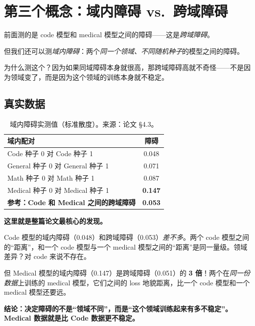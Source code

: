 \documentclass[12pt,a4paper]{ctexart}
\begin{document}
\section{第三个概念：域内障碍 vs.\ 跨域障碍}

\begin{explainbox}
前面测的是 code 模型和 medical 模型之间的障碍——这是\emph{跨域障碍}。

但我们还可以测\emph{域内障碍}：两个\emph{同一个领域、不同随机种子}的模型之间的障碍。

为什么测这个？因为如果同域障碍本身就很高，那跨域障碍高就不奇怪——不是因为领域变了，而是因为这个领域的训练本身就不稳定。
\end{explainbox}

\subsection*{真实数据}

\begin{table}[H]
\centering
\begin{tabular}{lc}
\toprule
\textbf{域内配对} & \textbf{障碍} \\
\midrule
Code 种子 0 对 Code 种子 1 & 0.048 \\
General 种子 0 对 General 种子 1 & 0.071 \\
Math 种子 0 对 Math 种子 1 & 0.087 \\
Medical 种子 0 对 Medical 种子 1 & \textcolor{medred}{\textbf{0.147}} \\
\midrule
\textbf{参考：Code 和 Medical 之间的跨域障碍} & \textbf{0.053} \\
\bottomrule
\end{tabular}
\caption{域内障碍实测值（标准散度）。来源：论文 \S4.3。}
\end{table}

\begin{resultbox}
\textbf{这里就是整篇论文最核心的发现。}

Code 模型的域内障碍（0.048）和跨域障碍（0.053）\emph{差不多}。两个 code 模型之间的``距离''，和一个 code 模型与一个 medical 模型之间的``距离''是同一量级。领域差异？对 code 来说不存在。

但 Medical 模型的域内障碍（0.147）是跨域障碍（0.051）的 \textbf{3 倍}！两个在\emph{同一份数据}上训练的 medical 模型，它们之间的 loss 地貌距离，比一个 code 模型和一个 medical 模型还要远。

\textbf{结论：决定障碍的不是``领域不同''，而是``这个领域训练起来有多不稳定''。Medical 数据就是比 Code 数据更不稳定。}
\end{resultbox}
\end{document}
